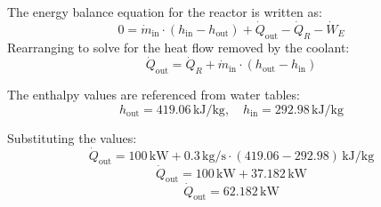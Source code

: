 The energy balance equation for the reactor is written as:  
\[
0 = \dot{m}_{\text{in}} \cdot (h_{\text{in}} - h_{\text{out}}) + \dot{Q}_{\text{out}} - \dot{Q}_R - \dot{W}_E
\]  
Rearranging to solve for the heat flow removed by the coolant:  
\[
\dot{Q}_{\text{out}} = \dot{Q}_R + \dot{m}_{\text{in}} \cdot (h_{\text{out}} - h_{\text{in}})
\]  

The enthalpy values are referenced from water tables:  
\[
h_{\text{out}} = 419.06 \, \text{kJ/kg}, \quad h_{\text{in}} = 292.98 \, \text{kJ/kg}
\]  

Substituting the values:  
\[
\dot{Q}_{\text{out}} = 100 \, \text{kW} + 0.3 \, \text{kg/s} \cdot (419.06 - 292.98) \, \text{kJ/kg}
\]  
\[
\dot{Q}_{\text{out}} = 100 \, \text{kW} + 37.182 \, \text{kW}
\]  
\[
\dot{Q}_{\text{out}} = 62.182 \, \text{kW}
\]